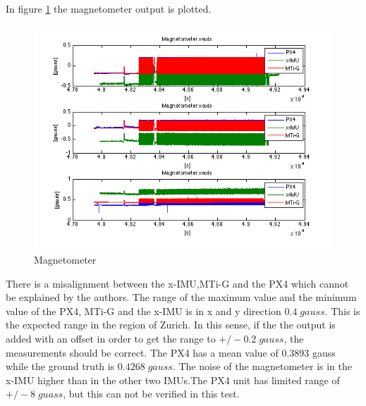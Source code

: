 In figure \ref{ct_mag} the magnetometer output is plotted.
\begin{figure}[hb]
\includegraphics[width=1\textwidth]{pictures/ct_mag.png}
\caption{Magnetometer}
\label{ct_mag}
\end{figure}
There is a misalignment between the x-IMU,MTi-G and the PX4 which cannot be explained by the authors. The range of the maximum value and the minimum value of the PX4, MTi-G and the x-IMU is in x and y direction $0.4 \;gauss$. This is the expected range in the region of Zurich. In this sense, if the the output is added with an offset in order to get the range to $+/- 0.2\; gauss$, the measurements should be correct. The PX4 has a mean value of $0.3893$ gauss while the ground truth is $0.4268 \;gauss$.  The noise of the magnetometer is in the x-IMU higher than in the other two IMUs.The PX4 unit has limited range of $+/-8\;guass$, but this can not be verified in this test.

